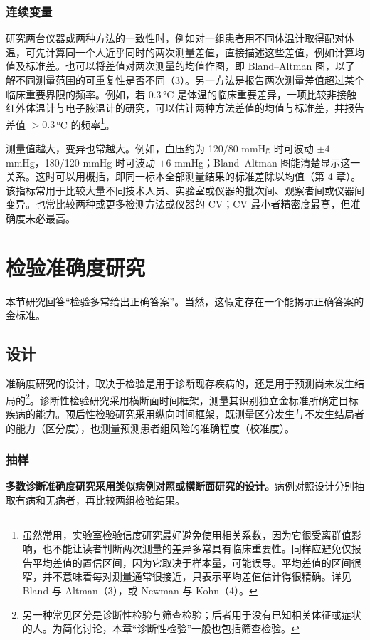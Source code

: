\subsubsection{连续变量}
研究两台仪器或两种方法的一致性时，例如对一组患者用不同体温计取得配对体温，可先计算同一个人近乎同时的两次测量差值，直接描述这些差值，例如计算均值及标准差。也可以将差值对两次测量的均值作图，即 Bland–Altman 图，以了解不同测量范围的可重复性是否不同（3）。另一方法是报告两次测量差值超过某个临床重要界限的频率。例如，若 0.3\,°C 是体温的临床重要差异，一项比较非接触红外体温计与电子腋温计的研究，可以估计两种方法差值的均值与标准差，并报告差值 $>0.3$\,°C 的频率\footnote{虽然常用，实验室检验信度研究最好避免使用相关系数，因为它很受离群值影响，也不能让读者判断两次测量的差异多常具有临床重要性。同样应避免仅报告平均差值的置信区间，因为它取决于样本量，可能误导。平均差值的区间很窄，并不意味着每对测量通常很接近，只表示平均差值估计得很精确。详见 Bland 与 Altman（3），或 Newman 与 Kohn（4）。}。

测量值越大，变异也常越大。例如，血压约为 120/80 mmHg 时可波动 $\pm4$ mmHg，180/120 mmHg 时可波动 $\pm6$ mmHg；Bland–Altman 图能清楚显示这一关系。这时可以用概括，即同一标本全部测量结果的标准差除以均值（第 4 章）。该指标常用于比较大量不同技术人员、实验室或仪器的批次间、观察者间或仪器间变异。也常比较两种或更多检测方法或仪器的 CV；CV 最小者精密度最高，但准确度未必最高。

\section{检验准确度研究}
本节研究回答“检验多常给出正确答案”。当然，这假定存在一个能揭示正确答案的金标准。

\subsection{设计}
准确度研究的设计，取决于检验是用于诊断现存疾病的，还是用于预测尚未发生结局的\footnote{另一种常见区分是诊断性检验与筛查检验；后者用于没有已知相关体征或症状的人。为简化讨论，本章“诊断性检验”一般也包括筛查检验。}。诊断性检验研究采用横断面时间框架，测量其识别独立金标准所确定目标疾病的能力。预后性检验研究采用纵向时间框架，既测量区分发生与不发生结局者的能力（区分度），也测量预测患者组风险的准确程度（校准度）。

\subsubsection{抽样}
\textbf{多数诊断准确度研究采用类似病例对照或横断面研究的设计。}病例对照设计分别抽取有病和无病者，再比较两组检验结果。

